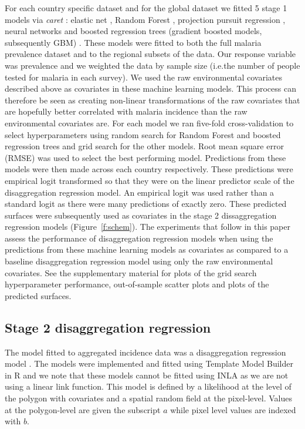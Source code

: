 \documentclass[review]{elsarticle}
\begin{document}
For each country specific dataset and for the global dataset we fitted 5 stage 1 models via \emph{caret} \citep{caret}: elastic net \citep{enet}, Random Forest \citep{wright2015ranger}, projection pursuit regression \citep{friedman1981projection}, neural networks \citep{nnet} and boosted regression trees (gradient boosted models, subsequently GBM) \citep{gbm}.
These models were fitted to both the full malaria prevalence dataset and to the regional subsets of the data.
Our response variable was prevalence and we weighted the data by sample size (i.e.\thinspace the number of people tested for malaria in each survey).
We used the raw environmental covariates described above as covariates in these machine learning models.
This process can therefore be seen as creating non-linear transformations of the raw covariates that are hopefully better correlated with malaria incidence than the raw environmental covariates are.
For each model we ran five-fold cross-validation to select hyperparameters using random search for Random Forest and boosted regression trees and grid search for the other models. 
Root mean square error (RMSE) was used to select the best performing model.
Predictions from these models were then made across each country respectively.
These predictions were empirical logit transformed so that they were on the linear predictor scale of the disaggregation regression model.
An empirical logit was used rather than a standard logit as there were many predictions of exactly zero.
These predicted surfaces were subsequently used as covariates in the stage 2 dissaggregation regression models (Figure~\ref{f:schem}).
The experiments that follow in this paper assess the performance of disaggregation regression models when using the predictions from these machine learning models as covariates as compared to a baseline disaggregation regression model using only the raw environmental covariates.
See the supplementary material for plots of the grid search hyperparameter performance, out-of-sample scatter plots and plots of the predicted surfaces.





\subsection{Stage 2 disaggregation regression}
The model fitted to aggregated incidence data was a disaggregation regression model \citep{sturrock2014fine, wilson2017pointless, law2018variational, taylor2017continuous, li2012log}.
The models were implemented and fitted using Template Model Builder \citep{TMB} in R \citep{R} and we note that these models cannot be fitted using INLA \citep{INLA} as we are not using a linear link function.
This model is defined by a likelihood at the level of the polygon with covariates and a spatial random field at the pixel-level. 
Values at the polygon-level are given the subscript $a$ while pixel level values are indexed with $b$.
\end{document}
